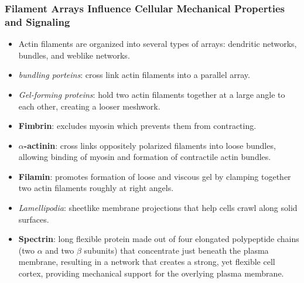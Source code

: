 \documentclass[12pt,a4paper]{article}
\begin{document}
\subsubsection{Filament Arrays Influence Cellular Mechanical Properties and Signaling}
\begin{itemize}
    \item Actin filaments are organized into several types of arrays: dendritic networks, bundles, and weblike networks. 
    \item \textit{bundling porteins}: cross link actin filaments into a parallel array.
    \item \textit{Gel-forming proteins}: hold two actin filaments together at a large angle to each other, creating a looser meshwork.
    \item \textbf{Fimbrin}: excludes myosin which prevents them from contracting. 
    \item \textbf{$\alpha$-actinin}: cross links oppositely polarized filaments into loose bundles, allowing binding of myosin and formation of contractile actin bundles. 
    \item \textbf{Filamin}: promotes formation of loose and viscous gel by clamping together two actin filaments roughly at right angels.
    \item \textit{Lamellipodia}: sheetlike membrane projections that help cells crawl along solid surfaces.
    \item \textbf{Spectrin}: long flexible protein made out of four elongated polypeptide chains (two $\alpha$ and two $\beta$ subunits) that concentrate just beneath the plasma membrane, resulting in a network that creates a strong, yet flexible cell cortex, providing mechanical support for the overlying plasma membrane. 
\end{itemize}
\end{document}
